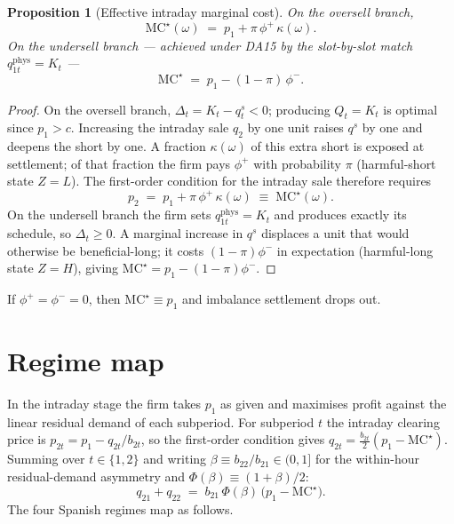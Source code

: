 \documentclass[11pt,a4paper]{article}
\newtheorem{proposition}{Proposition}
\begin{document}
\begin{proposition}[Effective intraday marginal cost]
\label{prop:mcstar}
On the oversell branch,
\[
\mathrm{MC}^\star(\omega) \;=\; p_1 + \pi\,\phi^+\,\kappa(\omega).
\]
On the undersell branch --- achieved under DA15 by the slot-by-slot match
$q_{1t}^{\mathrm{phys}} = K_t$ ---
\[
\mathrm{MC}^\star \;=\; p_1 - (1-\pi)\,\phi^-.
\]
\end{proposition}

\begin{proof}
On the oversell branch, $\Delta_t = K_t - q_t^s < 0$; producing $Q_t = K_t$ is
optimal since $p_1 > c$. Increasing the intraday sale $q_2$ by one unit raises
$q^s$ by one and deepens the short by one. A fraction $\kappa(\omega)$ of this
extra short is exposed at settlement; of that fraction the firm pays $\phi^+$
with probability $\pi$ (harmful-short state $Z=L$). The first-order condition
for the intraday sale therefore requires
\begin{equation*}
p_2 \;=\; p_1 + \pi\,\phi^+\,\kappa(\omega) \;\equiv\; \mathrm{MC}^\star(\omega).
\end{equation*}
On the undersell branch the firm sets $q_{1t}^{\mathrm{phys}} = K_t$ and
produces exactly its schedule, so $\Delta_t \geq 0$. A marginal increase in
$q^s$ displaces a unit that would otherwise be beneficial-long; it costs
$(1-\pi)\phi^-$ in expectation (harmful-long state $Z=H$), giving
$\mathrm{MC}^\star = p_1 - (1-\pi)\phi^-$.
\end{proof}

If $\phi^+=\phi^-=0$, then $\mathrm{MC}^\star \equiv p_1$ and imbalance
settlement drops out.

\section{Regime map}
\label{sec:regimes}

In the intraday stage the firm takes $p_1$ as given and maximises
profit against the linear residual demand of each subperiod.  For
subperiod $t$ the intraday clearing price is
$p_{2t} = p_1 - q_{2t}/b_{2t}$, so the first-order condition gives
$q_{2t} = \tfrac{b_{2t}}{2}(p_1 - \mathrm{MC}^\star)$.
Summing over $t\in\{1,2\}$ and writing $\beta\equiv b_{22}/b_{21}\in(0,1]$
for the within-hour residual-demand asymmetry and
$\Phi(\beta)\equiv(1+\beta)/2$:
\begin{equation}
q_{21}+q_{22} \;=\; b_{21}\,\Phi(\beta)\,\bigl(p_1 - \mathrm{MC}^\star\bigr).
\label{eq:xform}
\end{equation}
The four Spanish regimes map as follows.
\end{document}
